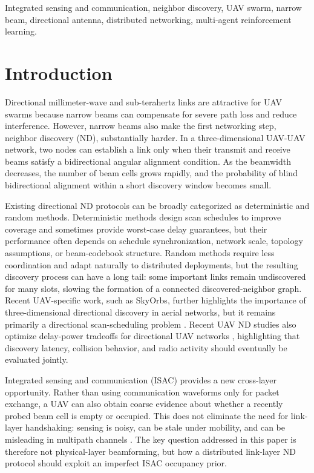 \documentclass[journal]{IEEEtran}
\begin{document}
\begin{IEEEkeywords}
Integrated sensing and communication, neighbor discovery, UAV swarm, narrow beam, directional antenna, distributed networking, multi-agent reinforcement learning.
\end{IEEEkeywords}

\section{Introduction}
Directional millimeter-wave and sub-terahertz links are attractive for UAV swarms because narrow beams can compensate for severe path loss and reduce interference.
However, narrow beams also make the first networking step, neighbor discovery (ND), substantially harder.
In a three-dimensional UAV-UAV network, two nodes can establish a link only when their transmit and receive beams satisfy a bidirectional angular alignment condition.
As the beamwidth decreases, the number of beam cells grows rapidly, and the probability of blind bidirectional alignment within a short discovery window becomes small.

Existing directional ND protocols can be broadly categorized as deterministic and random methods.
Deterministic methods design scan schedules to improve coverage and sometimes provide worst-case delay guarantees, but their performance often depends on schedule synchronization, network scale, topology assumptions, or beam-codebook structure.
Random methods require less coordination and adapt naturally to distributed deployments, but the resulting discovery process can have a long tail: some important links remain undiscovered for many slots, slowing the formation of a connected discovered-neighbor graph.
Recent UAV-specific work, such as SkyOrbs, further highlights the importance of three-dimensional directional discovery in aerial networks, but it remains primarily a directional scan-scheduling problem \cite{SkyOrbs2024TMC}.
Recent UAV ND studies also optimize delay-power tradeoffs for directional UAV networks \cite{Fan2026DelayPowerND}, highlighting that discovery latency, collision behavior, and radio activity should eventually be evaluated jointly.

Integrated sensing and communication (ISAC) provides a new cross-layer opportunity.
Rather than using communication waveforms only for packet exchange, a UAV can also obtain coarse evidence about whether a recently probed beam cell is empty or occupied.
This does not eliminate the need for link-layer handshaking: sensing is noisy, can be stale under mobility, and can be misleading in multipath channels \cite{Cui2024MultipathISAC}.
The key question addressed in this paper is therefore not physical-layer beamforming, but how a distributed link-layer ND protocol should exploit an imperfect ISAC occupancy prior.
\end{document}
